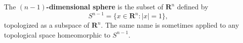 The \textbf{$(n-1)$-dimensional sphere} is the subset of $\mathbf{R}^n$ defined by
\[
S^{n-1} = \{ x \in \mathbf{R}^n : |x| = 1 \},
\]
topologized as a subspace of $\mathbf{R}^n$. The same name is sometimes applied to any topological space homeomorphic to $S^{n-1}$.
